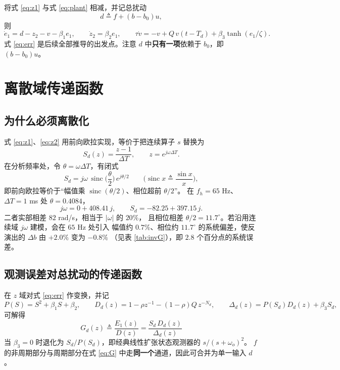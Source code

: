 \documentclass[11pt,a4paper]{ctexart}
\begin{document}
将式 \eqref{eq:z1} 与式 \eqref{eq:plant} 相减，并记总扰动
\begin{equation}
d\triangleq f+(b-b_0)u ,
\label{eq:dtot}
\end{equation}
则
\begin{equation}
\dot e_1=d-z_2-v-\beta_1e_1,\qquad \dot z_2=\beta_2e_1,\qquad
\tau\dot v=-v+Q\,v(t-T_d)+\beta_3\tanh(e_1/\zeta).
\label{eq:err}
\end{equation}
式 \eqref{eq:err} 是后续全部推导的出发点。注意 $d$ 中\textbf{只有一项}依赖于 $b_0$，即 $(b-b_0)u$。

\section{离散域传递函数}

\subsection{为什么必须离散化}

式 \eqref{eq:z1}、\eqref{eq:z2} 用前向欧拉实现，等价于把连续算子 $s$ 替换为
\begin{equation}
S_d(z)=\frac{z-1}{\Delta T},\qquad z=e^{j\omega\Delta T}.
\label{eq:Sd}
\end{equation}
在分析频率处，令 $\theta=\omega\Delta T$，有闭式
\begin{equation}
S_d=j\omega\,\operatorname{sinc}\!\Big(\frac{\theta}{2}\Big)\,e^{j\theta/2}
\qquad\Big(\operatorname{sinc}x\triangleq\frac{\sin x}{x}\Big),
\label{eq:Sd2}
\end{equation}
即前向欧拉等价于“幅值乘 $\operatorname{sinc}(\theta/2)$、相位超前 $\theta/2$”。
在 $f_h=65$ Hz、$\Delta T=1$ ms 处 $\theta=0.4084$，
\begin{equation}
j\omega = 0+408.41\,j,\qquad
S_d=-82.25+397.15\,j .
\end{equation}
二者实部相差 $82$ rad/s，相当于 $|\omega|$ 的 $20\%$，
且相位相差 $\theta/2=11.7^{\circ}$。若沿用连续域 $j\omega$ 建模，会在 $65$ Hz 处引入
幅值约 $0.7\%$、相位约 $11.7^{\circ}$ 的系统偏差，使反演出的 $\Delta b$ 由 $+2.0\%$ 变为 $-0.8\%$
（见表 \ref{tab:invG}），即 $2.8$ 个百分点的系统误差。

\subsection{观测误差对总扰动的传递函数}

在 $z$ 域对式 \eqref{eq:err} 作变换，并记
\begin{equation}
P(S)=S^2+\beta_1S+\beta_2,\qquad
D_d(z)=1-\rho z^{-1}-(1-\rho)Q\,z^{-N_d},\qquad
\Delta_d(z)=P(S_d)D_d(z)+\beta_3S_d ,
\label{eq:defs}
\end{equation}
可解得
\begin{equation}
\boxed{\;G_d(z)\triangleq\frac{E_1(z)}{D(z)}=\frac{S_d\,D_d(z)}{\Delta_d(z)}\;}
\label{eq:G}
\end{equation}
当 $\beta_3=0$ 时退化为 $S_d/P(S_d)$，即经典线性扩张状态观测器的 $s/(s+\omega_o)^2$。
$f$ 的非周期部分与周期部分在式 \eqref{eq:G} 中走\textbf{同一个}通道，因此可合并为单一输入 $d$。
\end{document}

